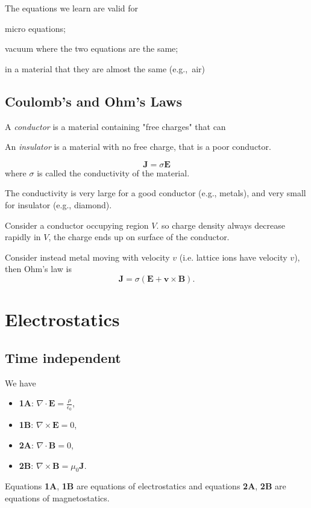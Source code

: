 The equations we learn are valid for
\begin{enumerate*}
    \item micro equations;
    \item vacuum where the two equations are the same;
    \item in a material that they are almost the same (e.g.,\ air)
\end{enumerate*}

\subsection{Coulomb's and Ohm's Laws}
\leavevmode
\begin{definition}
    A \textit{conductor} is a material containing "free charges" that can 

    An \textit{insulator} is a material with no free charge, that is a poor conductor.
\end{definition}
\begin{theorem}
    \[
        \mathbf{J} = \sigma \mathbf{E}
    \]
    where \(\sigma\) is called the conductivity of the material.
\end{theorem}
The conductivity is very large for a good conductor (e.g., metals), and very small for insulator (e.g., diamond).

Consider a conductor occupying region \(V\).
so charge density always decrease rapidly in \(V\), the charge ends up on surface of the conductor.

Consider instead metal moving with velocity \(v\) (i.e. lattice ions have velocity \(v\)), then Ohm's law is
\[
    \mathbf{J}  = \sigma(\mathbf{E} + \mathbf{v} \times \mathbf{B}).
\]
\section{Electrostatics}
\subsection{Time independent}
We have
\begin{itemize}
    \item \textbf{1A}: \(\nabla \cdot \mathbf{E}  = \frac{\rho}{\epsilon_0}\),
    \item \textbf{1B}: \(\nabla \times \mathbf{E} = 0\),
    \item \textbf{2A}: \(\nabla \cdot \mathbf{B}  = 0\),
    \item \textbf{2B}: \(\nabla \times \mathbf{B} = \mu_0 \mathbf{J}\).
\end{itemize}
Equations \textbf{1A}, \textbf{1B} are equations of electrostatics and equations \textbf{2A}, \textbf{2B} are equations of magnetostatics.

